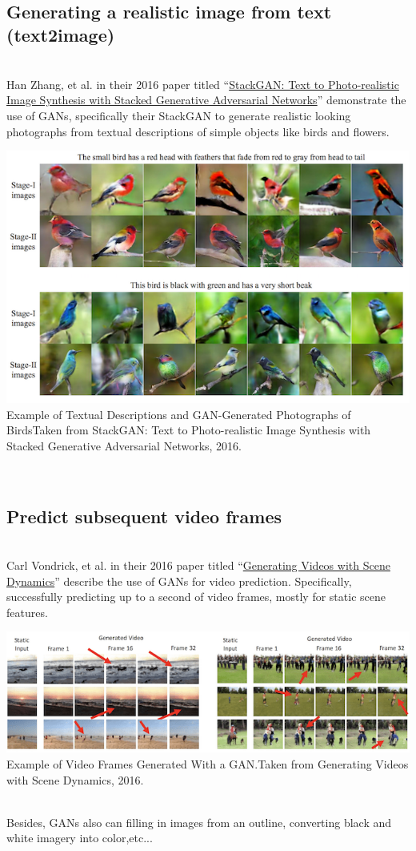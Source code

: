 \documentclass[14pt]{article}
\begin{document}
\\
\subsection{Generating a realistic image from text (text2image)}
\\
Han Zhang, et al. in their 2016 paper titled “\hyperlink{https://arxiv.org/abs/1612.03242}{StackGAN: Text to Photo-realistic Image Synthesis with Stacked Generative Adversarial Networks}” demonstrate the use of GANs, specifically their StackGAN to generate realistic looking photographs from textual descriptions of simple objects like birds and flowers.
\\
\begin{center}
    \includegraphics[width = 11 cm ]{14.png}
    Example of Textual Descriptions and GAN-Generated Photographs of BirdsTaken from StackGAN: Text to Photo-realistic Image Synthesis with Stacked Generative Adversarial Networks, 2016.
\end{center}
\\
\subsection{Predict subsequent video frames}
\\
Carl Vondrick, et al. in their 2016 paper titled “\hyperlink{https://arxiv.org/abs/1609.02612}{Generating Videos with Scene Dynamics}” describe the use of GANs for video prediction. Specifically, successfully predicting up to a second of video frames, mostly for static scene features.
\\

\begin{center}
    \includegraphics[width = 11 cm ]{15.png}
    Example of Video Frames Generated With a GAN.Taken from Generating Videos with Scene Dynamics, 2016.
\end{center}
\\
Besides, GANs also can filling in images from an outline, converting black and white imagery into color,etc...
\\
\end{document}
